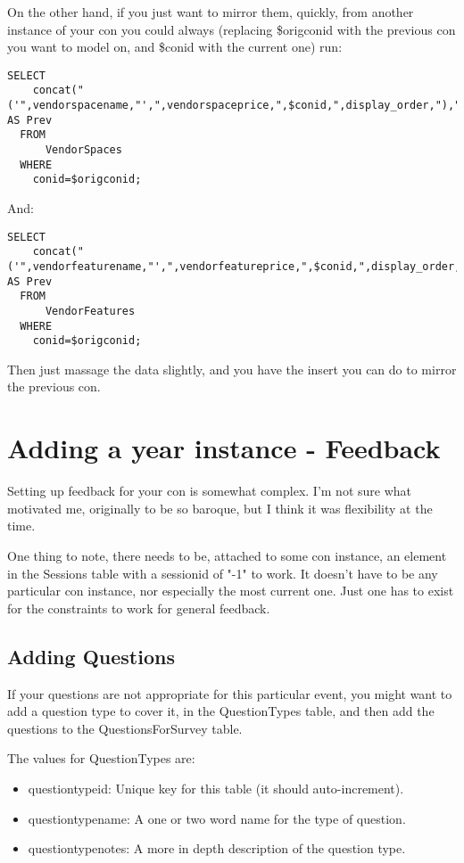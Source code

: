\documentclass[captions=tablesignature]{scrartcl}
\begin{document}
On the other hand, if you just want to mirror them, quickly, from
another instance of your con you could always (replacing \$origconid
with the previous con you want to model on, and \$conid with the
current one) run:
\begin{verbatim}
SELECT
    concat("('",vendorspacename,"',",vendorspaceprice,",$conid,",display_order,"),") AS Prev
  FROM
      VendorSpaces
  WHERE
    conid=$origconid;
\end{verbatim}
And:
\begin{verbatim}
SELECT
    concat("('",vendorfeaturename,"',",vendorfeatureprice,",$conid,",display_order,"),") AS Prev
  FROM
      VendorFeatures
  WHERE
    conid=$origconid;
\end{verbatim}
Then just massage the data slightly, and you have the insert you
can do to mirror the previous con.

\section{Adding a year instance - Feedback}
\label{sec-15}

Setting up feedback for your con is somewhat complex.  I'm not sure
what motivated me, originally to be so baroque, but I think it was
flexibility at the time.

One thing to note, there needs to be, attached to some con instance,
an element in the Sessions table with a sessionid of "-1" to work.
It doesn't have to be any particular con instance, nor especially
the most current one.  Just one has to exist for the constraints to
work for general feedback.
\subsection{Adding Questions}
\label{sec-15-1}

If your questions are not appropriate for this particular event,
you might want to add a question type to cover it, in the
QuestionTypes table, and then add the questions to the
QuestionsForSurvey table.

The values for QuestionTypes are:
\begin{itemize}
\item questiontypeid: Unique key for this table (it should auto-increment).
\item questiontypename: A one or two word name for the type of question.
\item questiontypenotes: A more in depth description of the question type.
\end{itemize}
\end{document}
